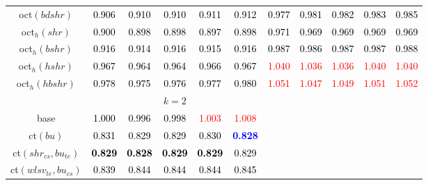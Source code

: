 \begin{tabular}[t]{c|>{}cccc>{}c|ccccc}
oct$(bdshr)$ & \textcolor{black}{0.906} & \textcolor{black}{0.910} & \textcolor{black}{0.910} & \textcolor{black}{0.911} & \textcolor{black}{0.912} & \textcolor{black}{0.977} & \textcolor{black}{0.981} & \textcolor{black}{0.982} & \textcolor{black}{0.983} & \textcolor{black}{0.985}\\
oct$_h(shr)$ & \textcolor{black}{0.900} & \textcolor{black}{0.898} & \textcolor{black}{0.898} & \textcolor{black}{0.897} & \textcolor{black}{0.898} & \textcolor{black}{0.971} & \textcolor{black}{0.969} & \textcolor{black}{0.969} & \textcolor{black}{0.969} & \textcolor{black}{0.969}\\
oct$_h(bshr)$ & \textcolor{black}{0.916} & \textcolor{black}{0.914} & \textcolor{black}{0.916} & \textcolor{black}{0.915} & \textcolor{black}{0.916} & \textcolor{black}{0.987} & \textcolor{black}{0.986} & \textcolor{black}{0.987} & \textcolor{black}{0.987} & \textcolor{black}{0.988}\\
oct$_h(hshr)$ & \textcolor{black}{0.967} & \textcolor{black}{0.964} & \textcolor{black}{0.964} & \textcolor{black}{0.966} & \textcolor{black}{0.967} & \textcolor{red}{1.040} & \textcolor{red}{1.036} & \textcolor{red}{1.036} & \textcolor{red}{1.040} & \textcolor{red}{1.040}\\
oct$_h(hbshr)$ & \textcolor{black}{0.978} & \textcolor{black}{0.975} & \textcolor{black}{0.976} & \textcolor{black}{0.977} & \textcolor{black}{0.980} & \textcolor{red}{1.051} & \textcolor{red}{1.047} & \textcolor{red}{1.049} & \textcolor{red}{1.051} & \textcolor{red}{1.052}\\
\addlinespace[0.3em]
\multicolumn{1}{c}{} & \multicolumn{5}{c}{\textbf{$k = 2$}} & \multicolumn{5}{c}{}\\
base & \textcolor{black}{1.000} & \textcolor{black}{0.996} & \textcolor{black}{0.998} & \textcolor{red}{1.003} & \textcolor{red}{1.008} &  &  &  &  & \\
ct$(bu)$ & \textcolor{black}{0.831} & \textcolor{black}{0.829} & \textcolor{black}{0.829} & \textcolor{black}{0.830} & \textcolor{blue}{\textbf{0.828}} &  &  &  &  & \\
ct$(shr_{cs}, bu_{te})$ & \textcolor{black}{\textbf{0.829}} & \textcolor{black}{\textbf{0.828}} & \textcolor{black}{\textbf{0.829}} & \textcolor{black}{\textbf{0.829}} & \textcolor{black}{0.829} &  &  &  &  & \\
ct$(wlsv_{te}, bu_{cs})$ & \textcolor{black}{0.839} & \textcolor{black}{0.844} & \textcolor{black}{0.844} & \textcolor{black}{0.844} & \textcolor{black}{0.845} &  &  &  &  & \\

\end{tabular}
